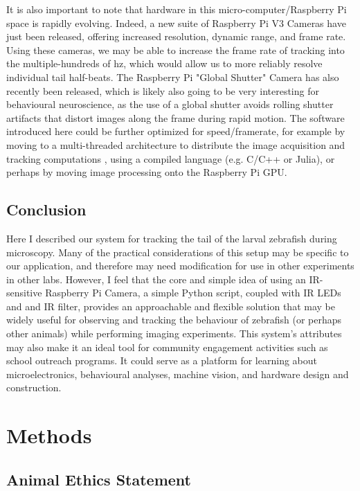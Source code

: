 \documentclass[9pt,lineno]{RandlettLab_elife}
\begin{document}
It is also important to note that hardware in this micro-computer/Raspberry Pi space is rapidly evolving. Indeed, a new suite of Raspberry Pi V3 Cameras have just been released, offering increased resolution, dynamic range, and frame rate. Using these cameras, we may be able to increase the frame rate of tracking into the multiple-hundreds of hz, which would allow us to more reliably resolve individual tail half-beats. The Raspberry Pi "Global Shutter" Camera has also recently been released, which is likely also going to be very interesting for behavioural neuroscience, as the use of a global shutter avoids rolling shutter artifacts that distort images along the frame during rapid motion. The software introduced here could be further optimized for speed/framerate, for example by moving to a multi-threaded architecture to distribute the image acquisition and tracking computations \citep{Zhu2023, Randlett2019-fj}, using a compiled language (e.g.  C/C++ or Julia), or perhaps by moving image processing onto the Raspberry Pi GPU. 

\subsection{Conclusion}

Here I described our system for tracking the tail of the larval zebrafish during microscopy. Many of the practical considerations of this setup may be specific to our application, and therefore may need modification for use in other experiments in other labs. However, I feel that the core and simple idea of using an IR-sensitive Raspberry Pi Camera, a simple Python script, coupled with IR LEDs and and IR filter, provides an approachable and flexible solution that may be widely useful for observing and tracking the behaviour of zebrafish (or perhaps other animals) while performing imaging experiments. This system's attributes may also make it an ideal tool for community engagement activities such as school outreach programs. It could serve as a platform for learning about microelectronics, behavioural analyses, machine vision, and hardware design and construction.



\section{Methods}

\subsection{Animal Ethics Statement}
\end{document}
